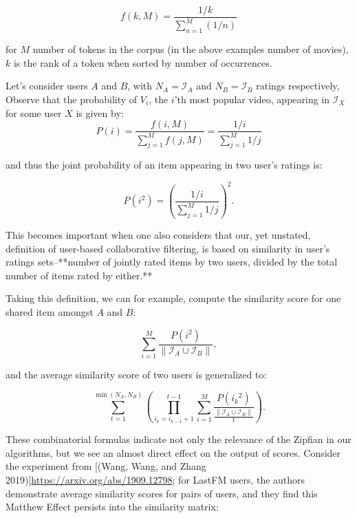 \begin{equation}
    f(k, M) = \frac{1/k}{\sum^M_{n=1}(1/n)}    
\end{equation}


for $M$ number of tokens in the corpus (in the above examples number of movies), $k$ is the rank of a token when sorted by number of occurrences. 

Let's consider users $A$ and $B$, with $N_A = \mathcal{I}_A$  and $N_B = \mathcal{I}_B$ ratings respectively, Observe that the probability of $V_i$, the $i$'th most popular video, appearing in $\mathcal{I}_X$ for some user $X$ is given by:
\begin{equation}
    P(i)=\frac{f(i,M)}{\sum^M_{j=1}f(j,M)}=\frac{1/i}{\sum^M_{j=1}1/j}
\end{equation}

and thus the joint probability of an item appearing in two user's ratings is:

\begin{equation}
  P(i^2)=\left(\frac{1/i}{\sum^M_{j=1}1/j}\right)^2.  
\end{equation}

This becomes important when one also considers that our, yet unstated, definition of user-based collaborative filtering, is based on similarity in user's ratings sets–**number of jointly rated items by two users, divided by the total number of items rated by either.**

Taking this definition, we can for example, compute the similarity score for one shared item amongst $A$ and $B$:

\begin{equation}
    \sum^M_{i=1} \frac{P(i^2)}{\| \mathcal{I}_A \cup \mathcal{I}_B \|},
\end{equation}

and the average similarity score of two users is generalized to:

\begin{equation}
    \sum^{\min(N_A,N_B)}_{t=1}\left(\prod_{i_k=i_{k-1}+1}^{t-1}\sum^M_{i=1} \frac{P({i_k}^2)}{\frac{\| \mathcal{I}_A \cup \mathcal{I}_B \|}{t}}\right).
\end{equation}

These combinatorial formulas indicate not only the relevance of the Zipfian in our algorithms, but we see an almost direct effect on the output of scores. Consider the experiment from [(Wang, Wang, and Zhang 2019)]\url{https://arxiv.org/abs/1909.12798}; for LastFM users, the authors demonstrate average similarity scores for pairs of users, and they find this Matthew Effect persists into the similarity matrix:

